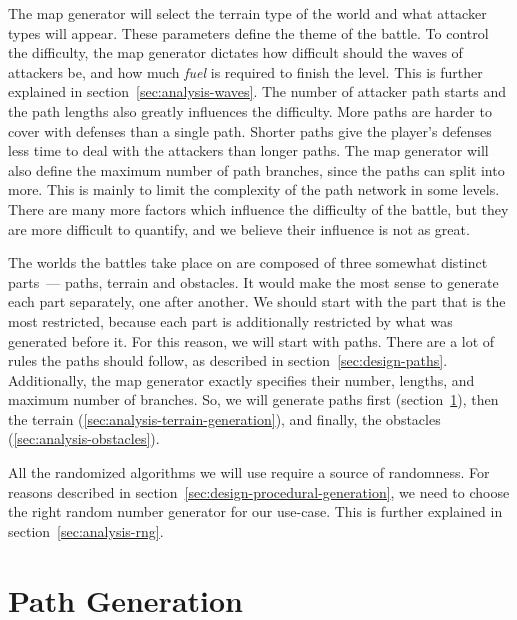 The map generator will select the terrain type of the world and what attacker types will appear.
These parameters define the theme of the battle.
To control the difficulty, the map generator dictates how difficult should the waves of attackers be, and how much \emph{fuel} is required to finish the level.
This is further explained in section~\ref{sec:analysis-waves}.
The number of attacker path starts and the path lengths also greatly influences the difficulty.
More paths are harder to cover with defenses than a single path.
Shorter paths give the player's defenses less time to deal with the attackers than longer paths.
The map generator will also define the maximum number of path branches, since the paths can split into more.
This is mainly to limit the complexity of the path network in some levels.
There are many more factors which influence the difficulty of the battle, but they are more difficult to quantify, and we believe their influence is not as great.

The worlds the battles take place on are composed of three somewhat distinct parts~--- paths, terrain and obstacles.
It would make the most sense to generate each part separately, one after another.
We should start with the part that is the most restricted, because each part is additionally restricted by what was generated before it.
For this reason, we will start with paths.
There are a lot of rules the paths should follow, as described in section~\ref{sec:design-paths}.
Additionally, the map generator exactly specifies their number, lengths, and maximum number of branches.
So, we will generate paths first (section~\ref{sec:analysis-path-generation}), then the terrain (\ref{sec:analysis-terrain-generation}), and finally, the obstacles (\ref{sec:analysis-obstacles}).

All the randomized algorithms we will use require a source of randomness.
For reasons described in section~\ref{sec:design-procedural-generation}, we need to choose the right random number generator for our use-case.
This is further explained in section~\ref{sec:analysis-rng}.

\section{Path Generation}\label{sec:analysis-path-generation}

